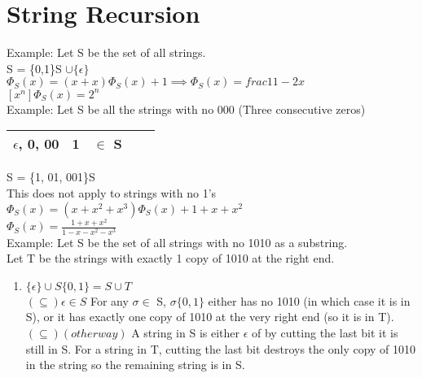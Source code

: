 \documentclass[12pt]{article}
\begin{document}
	
	\section*{String Recursion}
	Example: Let S be the set of all strings.\\
	S = \{0,1\}S $\cup \{\epsilon \}$\\
	
	$\Phi_S(x) = (x+x)\Phi_S(x) + 1 \implies \Phi_S(x) = frac{1}{1-2x}$\\
	$[x^n]\Phi_S(x) = 2^n$\\
	
	Example: Let S be all the strings with no 000 (Three consecutive zeros)\\
	
	\begin{tabular}{c c | c | c c }
		$\epsilon$, 0, 00 & 1 & $\in$ S && \\ \hline	
	\end{tabular}
	
	S = \{1, 01, 001\}S\\
	This does not apply to strings with no 1's\\
	$\Phi_S(x) = (x + x^2 + x^3)\Phi_S(x) + 1 + x + x^2$\\
	$\Phi_S(x) = \frac{1+x+x^2}{1-x-x^2 - x^3}$\\
	
	Example: Let S be the set of all strings with no 1010 as a substring.\\
	
	Let T be the strings with exactly 1 copy of 1010 at the right end.\\
	
	\begin{enumerate}
		\item $\{\epsilon \} \cup S\{0,1\} = S \cup T$\\
				$(\subseteq) \epsilon \in S$ For any $\sigma \in$ S, $\sigma \{0,1\}$ either has no 1010 (in which case it is in S), or it has exactly one copy of 1010 at the very right end (so it is in T).\\
				$(\subseteq) (other way)$ A string in S is either $\epsilon$ of by cutting the last bit it is still in S. For a string in T, cutting the last bit destroys the only copy of 1010 in the string so the remaining string is in S.\\
	\end{enumerate}
	
	
	
	
\end{document}
